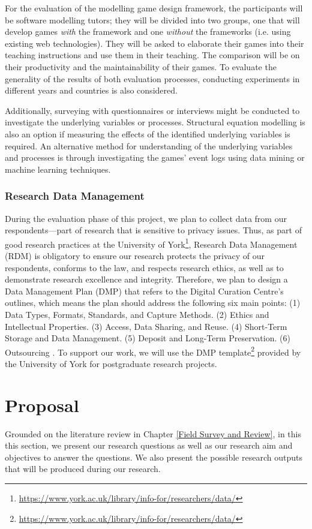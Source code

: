 \documentclass[12pt, a4paper]{report}
\begin{document}
For the evaluation of the modelling game design framework, the participants will be software modelling tutors; they will be divided into two groups, one that will develop games \emph{with} the framework and one \emph{without} the frameworks (i.e. using existing web technologies). They will be asked to elaborate their games into their teaching instructions and use them in their teaching. The comparison will be on their productivity and the maintainability of their games. To evaluate the generality of the results of both evaluation processes, conducting experiments in different years and countries is also considered.

Additionally, surveying with questionnaires or interviews might be conducted to investigate the underlying variables or processes. Structural equation modelling \cite{hair2016primer} is also an option if measuring the effects of the identified underlying variables is required. An alternative method for understanding of the underlying variables and processes is through investigating the games' event logs using data mining or machine learning techniques.


\subsection{Research Data Management}
During the evaluation phase of this project, we plan to collect data from our respondents---part of research that is sensitive to privacy issues. Thus, as  part of good research practices at the University of York\footnote{\url{https://www.york.ac.uk/library/info-for/researchers/data/}}, Research Data Management (RDM) is obligatory to ensure our research protects the privacy of our respondents, conforms to the law, and respects research ethics, as well as to demonstrate research excellence and integrity. Therefore, we plan to design a Data Management Plan (DMP) that refers to the Digital Curation Centre's outlines, which means the plan should address the following six main points: (1) Data Types, Formats, Standards, and Capture Methods. (2) Ethics and Intellectual Properties. (3) Access, Data Sharing, and Reuse. (4) Short-Term Storage and Data Management. (5) Deposit and Long-Term Preservation. (6) Outsourcing \cite{jones2011develop}. To support our work, we will use the DMP template\footnote{\url{https://www.york.ac.uk/library/info-for/researchers/data/}} provided by the University of York for postgraduate research projects.
       

\chapter{Proposal}
\label{Proposal}
Grounded on the literature review in Chapter \ref{Field Survey and Review}, in this this section, we present our research questions as well as our research aim and objectives to answer the questions. We also present the possible research outputs that will be produced during our research.  
\end{document}
